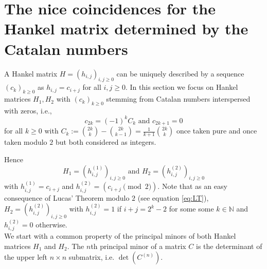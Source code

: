 \documentclass{article}
\newcommand{\NN}{\mathbb N}
\begin{document}
\section{The nice coincidences for the Hankel matrix determined by the Catalan numbers}\label{sec:3}
 

A Hankel matrix $H=(h_{i,j})_{i,j\geq 0}$ can be uniquely described by a sequence $(c_{k})_{k\geq 0}$ as $h_{i,j}=c_{i+j}$ for all $i,j\geq 0$. In this section we focus on Hankel matrices $H_1,H_2$ with $(c_k)_{k\geq 0}$ stemming from Catalan numbers interspersed with zeros, i.e., 
$$c_{2k}=(-1)^kC_k \mbox{ and } c_{2k+1}=0$$
for all $k\geq 0$ with $C_k:=\binom{2k}{k}-\binom{2k}{k-1}=\frac{1}{k+1}\binom{2k}{k}$ once taken pure and once taken modulo ${2}$ but both considered as integers. 

Hence 
$$H_1=(h^{(1)}_{i,j})_{i,j\geq 0}\mbox{ and }H_2=(h^{(2)}_{i,j})_{i,j\geq 0}$$ with $ h^{(1)}_{i,j}=c_{i+j}$ and $h^{(2)}_{i,j}=(c_{i+j}\pmod{2})$. 
Note that as an easy consequence of Lucas' Theorem modulo $2$ (see equation \eqref{eq:LT}), $H_2=(h^{(2)}_{i,j})_{i,j\geq 0}$ with $h^{(2)}_{i,j}=1$ if  $i+j=2^k-2$ for some some $k\in\NN$ and $h^{(2)}_{i,j}=0$ otherwise. \\

We start with a common property of the principal minors of both Hankel matrices $H_1$ and $H_2$.  The $n$th principal minor of a matrix $C$ is the determinant of the upper left $n\times n$ submatrix, i.e. $\det(C^{(n)})$.
\end{document}
